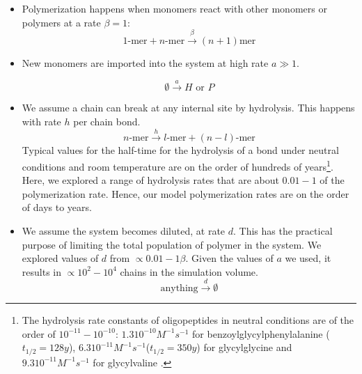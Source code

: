 \documentclass[twocolumn,letterpaper]{revtex4-1}
\begin{document}
\begin{itemize}
 \item Polymerization happens when monomers react with other monomers or polymers at a rate $\beta 
= 1$:
\begin{equation}
 1\mbox{-mer}+n\mbox{-mer} \xrightarrow{\beta} (n+1)\mbox{mer}
\end{equation}


\item New monomers are imported into the system at high rate $a\gg1$. 



\begin{equation}
 \emptyset \xrightarrow{a} H\,\,\mbox{or}\,\,P
\end{equation}

\item We assume a chain can break at any internal site by hydrolysis.  This happens with rate $h$ 
per chain bond. 
\begin{equation}
 n\mbox{-mer} \xrightarrow{h} l\mbox{-mer}+(n-l)\mbox{-mer}
\end{equation}
Typical values for the half-time for the hydrolysis of a bond under neutral conditions and room 
temperature are on the order of hundreds of years\footnote{The hydrolysis rate constants of 
oligopeptides in neutral conditions are of the order of $10^{-11}-10^{-10}$: $1.3  10^{-10} 
M^{-1}s^{-1} $ for benzoylglycylphenylalanine ($t_{1/2} = 128 y$)\cite{Bryant1996}, $6.3  10^{-11} 
M^{-1} s^{-1}$($t_{1/2}=350 y$) for glycylglycine and $9.3 10^{-11}M^{-1} s^{-1}$ for glycylvaline
\cite{Smith1998}.}. Here, we explored a range of hydrolysis rates that are about $0.01-1$ of the 
polymerization rate.  Hence, our model polymerization rates are on the order of days to years.

\item We assume the system becomes diluted, at rate $d$.  This has the practical purpose of 
limiting the total population of polymer in the system.  We explored values of $d$ from $\propto 
0.01- 1\beta$.  Given the values of $a$ we used, it results in $\propto 10^2- 10^4$ chains in the 
simulation volume.  
\begin{equation}
 \mbox{anything} \xrightarrow{d}\emptyset
\end{equation}


\end{itemize}
\end{document}
